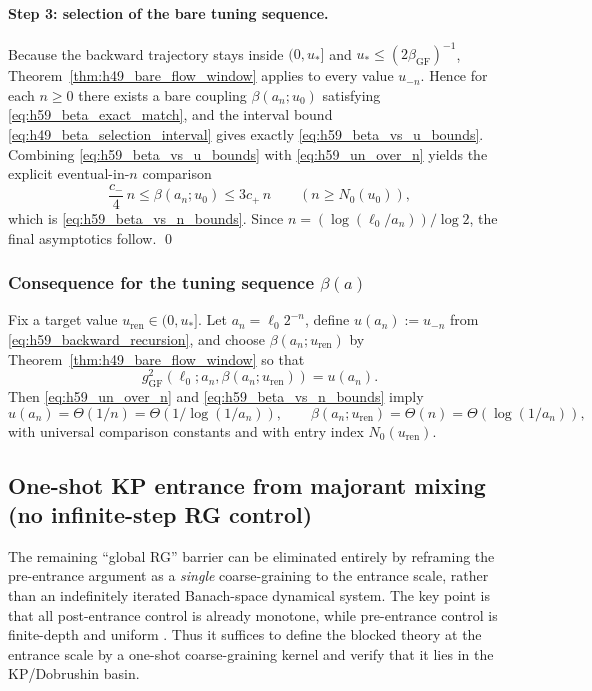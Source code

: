 \paragraph{Step 3: selection of the bare tuning sequence.}
Because the backward trajectory stays inside $(0,u_\ast]$ and $u_\ast\le (2\beta_{\mathrm{GF}})^{-1}$, Theorem~\ref{thm:h49_bare_flow_window} applies to every value $u_{-n}$.
Hence for each $n\ge 0$ there exists a bare coupling $\beta(a_n;u_0)$ satisfying \eqref{eq:h59_beta_exact_match}, and the interval bound \eqref{eq:h49_beta_selection_interval} gives exactly \eqref{eq:h59_beta_vs_u_bounds}.
Combining \eqref{eq:h59_beta_vs_u_bounds} with \eqref{eq:h59_un_over_n} yields the explicit eventual-in-$n$ comparison
\[
 \frac{c_-}{4}\,n
 \le
 \beta(a_n;u_0)
 \le
 3c_+\,n
 \qquad (n\ge N_0(u_0)),
\]
which is \eqref{eq:h59_beta_vs_n_bounds}.
Since $n=(\log(\ell_0/a_n))/\log 2$, the final asymptotics follow.
\qed

\subsubsection{Consequence for the tuning sequence \texorpdfstring{$\beta(a)$}{beta(a)}}
\label{subsec:h59_beta_of_a}
Fix a target value $u_{\mathrm{ren}}\in(0,u_\ast]$.
Let $a_n=\ell_0 2^{-n}$, define $u(a_n):=u_{-n}$ from \eqref{eq:h59_backward_recursion}, and choose $\beta(a_n;u_{\mathrm{ren}})$ by Theorem~\ref{thm:h49_bare_flow_window} so that
\[
 g_{\mathrm{GF}}^2(\ell_0;a_n,\beta(a_n;u_{\mathrm{ren}})) = u(a_n).
\]
Then \eqref{eq:h59_un_over_n} and \eqref{eq:h59_beta_vs_n_bounds} imply
\[
 u(a_n)=\Theta(1/n)=\Theta(1/\log(1/a_n)),
 \qquad
 \beta(a_n;u_{\mathrm{ren}})=\Theta(n)=\Theta(\log(1/a_n)),
\]
with universal comparison constants and with entry index $N_0(u_{\mathrm{ren}})$.



\subsection{One-shot KP entrance from majorant mixing (no infinite-step RG control)}
\label{sec:hardened60_one_shot}

The remaining ``global RG'' barrier can be eliminated entirely by reframing the pre-entrance argument as a \emph{single}
coarse-graining to the entrance scale, rather than an indefinitely iterated Banach-space dynamical system.
The key point is that all post-entrance control is already monotone, while pre-entrance control
is finite-depth and uniform . Thus it suffices to define the blocked theory at the entrance
scale by a one-shot coarse-graining kernel and verify that it lies in the KP/Dobrushin basin.

